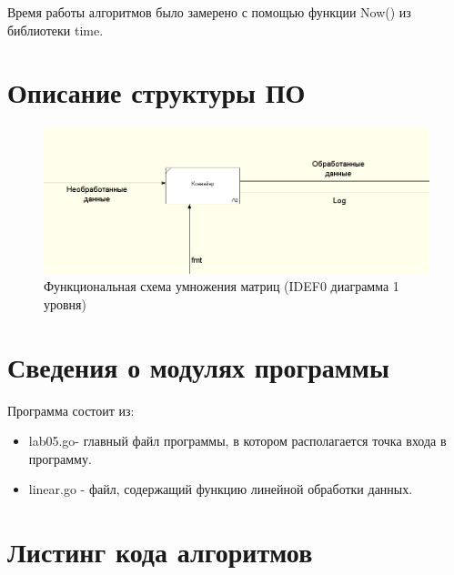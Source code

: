 \documentclass[12pt]{report}
\begin{document}
Время работы алгоритмов было замерено с помощью функции Now() из библиотеки time.

\section{Описание структуры ПО}
\begin{figure}[!htbp]
	\centering
	\includegraphics[width=1.25\linewidth]{lab05ram}
	\caption{Функциональная схема умножения матриц (IDEF0 диаграмма 1 уровня)}
	\label{fig:mpr}
\end{figure}

\section{Сведения о модулях программы}
Программа состоит из:
\begin{itemize}
	\item lab05.go- главный файл программы, в котором располагается точка входа в программу.
	\item linear.go - файл, содержащий функцию линейной обработки данных.
\end{itemize}

\section{Листинг кода алгоритмов}
\end{document}
